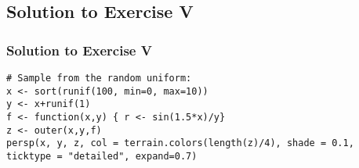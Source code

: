 \subsection{Solution to Exercise V}
  \begin{frame}[fragile]
  \frametitle{Solution to Exercise V}
 		\begin{lstlisting}
# Sample from the random uniform:
x <- sort(runif(100, min=0, max=10))
y <- x+runif(1)
f <- function(x,y) { r <- sin(1.5*x)/y}
z <- outer(x,y,f)
persp(x, y, z, col = terrain.colors(length(z)/4), shade = 0.1, ticktype = "detailed", expand=0.7)
 		\end{lstlisting}
\end{frame}
